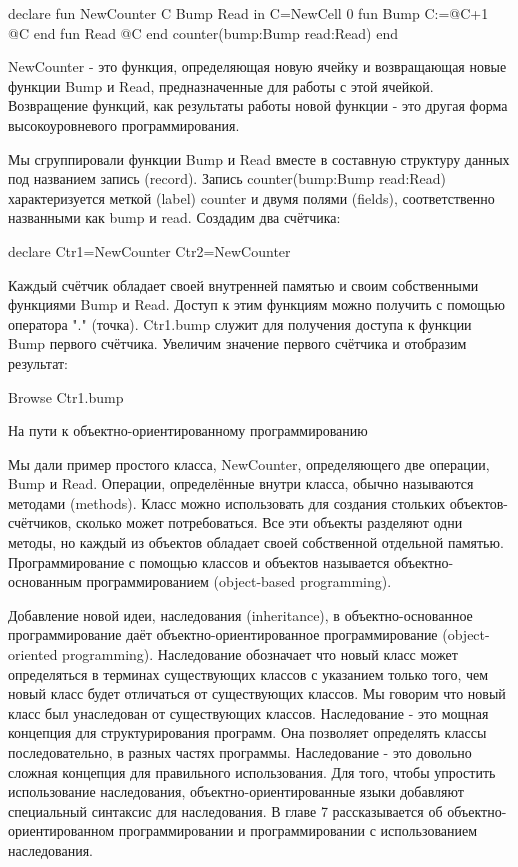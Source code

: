 declare
fun {NewCounter}
C Bump Read in
C={NewCell 0}
fun {Bump}
C:=@C+1
@C
end
fun {Read}
@C
end
counter(bump:Bump read:Read)
end

NewCounter - это функция, определяющая новую ячейку и возвращающая новые функции Bump и Read, предназначенные для работы с этой ячейкой. Возвращение функций, как результаты работы новой функции - это другая форма высокоуровневого программирования.

Мы сгруппировали функции Bump и Read вместе в составную структуру данных под названием запись (record). Запись counter(bump:Bump read:Read) характеризуется меткой (label) counter и двумя полями (fields), соответственно названными как bump и read. Создадим два счётчика:

declare
Ctr1={NewCounter}
Ctr2={NewCounter}

Каждый счётчик обладает своей внутренней памятью и своим собственными функциями Bump и Read. Доступ к этим функциям можно получить с помощью оператора "." (точка). Ctr1.bump служит для получения доступа к функции Bump первого счётчика. Увеличим значение первого счётчика и отобразим результат:

{Browse {Ctr1.bump}}

На пути к объектно-ориентированному программированию

Мы дали пример простого класса, NewCounter, определяющего две операции, Bump и Read. Операции, определённые внутри класса, обычно называются методами (methods). Класс можно использовать для создания стольких объектов-счётчиков, сколько может потребоваться. Все эти объекты разделяют одни методы, но каждый из объектов обладает своей собственной отдельной памятью. Программирование с помощью классов и объектов называется объектно-основанным программированием (object-based programming).

Добавление новой идеи, наследования (inheritance), в объектно-основанное программирование даёт объектно-ориентированное программирование (object-oriented programming). Наследование обозначает что новый класс может определяться в терминах существующих классов с указанием только того, чем новый класс будет отличаться от существующих классов. Мы говорим что новый класс был унаследован от существующих классов. Наследование - это мощная концепция для структурирования программ. Она позволяет определять классы последовательно, в разных частях программы. Наследование - это довольно сложная концепция для правильного использования. Для того, чтобы упростить использование наследования, объектно-ориентированные языки добавляют специальный синтаксис для наследования. В главе 7 рассказывается об объектно-ориентированном программировании и программировании с использованием наследования.

